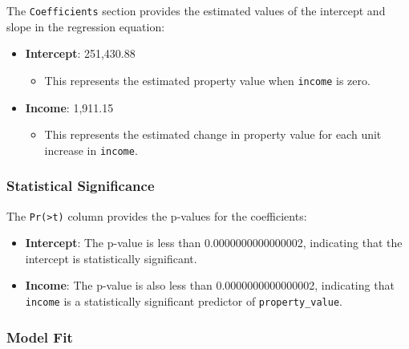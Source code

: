 \documentclass[
]{book}
\providecommand{\tightlist}{%
  \setlength{\itemsep}{0pt}\setlength{\parskip}{0pt}}
\begin{document}
The \texttt{Coefficients} section provides the estimated values of the intercept and slope in the regression equation:

\begin{itemize}
\item
  \textbf{Intercept}: 251,430.88

  \begin{itemize}
  \tightlist
  \item
    This represents the estimated property value when \texttt{income} is zero.
  \end{itemize}
\item
  \textbf{Income}: 1,911.15

  \begin{itemize}
  \tightlist
  \item
    This represents the estimated change in property value for each unit increase in \texttt{income}.
  \end{itemize}
\end{itemize}

\hypertarget{statistical-significance}{%
\subsubsection*{Statistical Significance}\label{statistical-significance}}

The \texttt{Pr(\textgreater{}\textbar{}t\textbar{})} column provides the p-values for the coefficients:

\begin{itemize}
\item
  \textbf{Intercept}: The p-value is less than 0.0000000000000002, indicating that the intercept is statistically significant.
\item
  \textbf{Income}: The p-value is also less than 0.0000000000000002, indicating that \texttt{income} is a statistically significant predictor of \texttt{property\_value}.
\end{itemize}

\hypertarget{model-fit}{%
\subsubsection*{Model Fit}\label{model-fit}}
\end{document}
